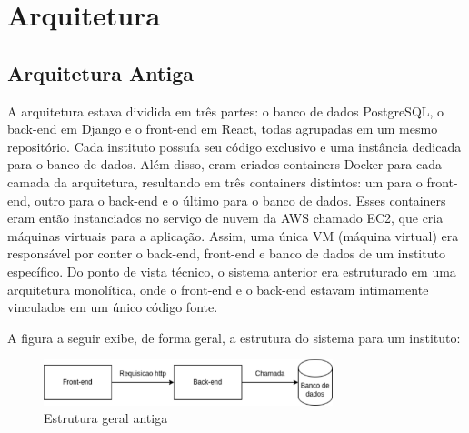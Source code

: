 

\newcommand{\sla}{\textbackslash}

\newcommand{\cmd}[1]{\textsf{#1}}

\newcommand{\pkg}[1]{\textsf{#1}}

\newcommand{\ltxcmd}[1]{\cmd{\sla{}#1}}

\chapter{Arquitetura}
\label{chap:arquitetura}

\enlargethispage{-.5\baselineskip}

\section{Arquitetura Antiga}

A arquitetura estava dividida em três partes: o banco de dados PostgreSQL, o back-end em Django e o front-end em React, todas agrupadas em um mesmo repositório. Cada instituto possuía seu código exclusivo e uma instância dedicada para o banco de dados. Além disso, eram criados containers Docker para cada camada da arquitetura, resultando em três containers distintos: um para o front-end, outro para o back-end e o último para o banco de dados. Esses containers eram então instanciados no serviço de nuvem da AWS chamado EC2, que cria máquinas virtuais para a aplicação. Assim, uma única VM (máquina virtual) era responsável por conter o back-end, front-end e banco de dados de um instituto específico. Do ponto de vista técnico, o sistema anterior era estruturado em uma arquitetura monolítica, onde o front-end e o back-end estavam intimamente vinculados em um único código fonte.

A figura a seguir exibe, de forma geral, a estrutura do sistema para um instituto:

\begin{figure}[!htb]
\centering
\includegraphics[width=0.75\textwidth]{figuras/arquitetura_antiga.pdf}
\caption{Estrutura geral antiga}
\label{estrutura_antiga}
\end{figure}

